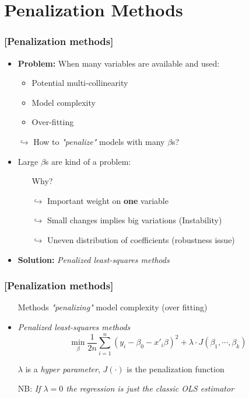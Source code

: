 \documentclass[xcolor=x11names,compress]{beamer}
\renewcommand{\(}{\begin{columns}}
\renewcommand{\)}{\end{columns}}
\newcommand{\<}[1]{\begin{column}{#1}}
\renewcommand{\>}{\end{column}}
\begin{document}
\section{Penalization Methods}


\begin{frame} %
\frametitle{\textcolor{brique}{[Penalization methods]}}
\pause
\begin{itemize}[<+->]
\item \textbf{Problem:} When many variables are available and used:
 \begin{itemize}[<+->]
        \item Potential multi-collinearity
        \item Model complexity
        \item Over-fitting
    \end{itemize}
\item[$\hookrightarrow$]  How to \emph{"penalize"} models with many $\beta$s?
\item Large $\beta$s are kind of a problem:
    \begin{itemize}[<+->]
            \item[]\begin{center} \large{ Why?} \end{center}
            \item[$\hookrightarrow$] Important weight on \textbf{one} variable
            \item[$\hookrightarrow$] Small changes implies big variations (Instability)
            \item[$\hookrightarrow$] Uneven distribution of coefficients (robustness issue)
        \end{itemize}
\item \textbf{Solution:}  \textit{ Penalized least-squares methods}
\end{itemize}
\end{frame}


\begin{frame} %
\frametitle{\textcolor{brique}{[Penalization methods]}}
\pause
\begin{itemize}[<+->]
\item[]  Methods  \emph{"penalizing"} model complexity (over fitting)
\item \textit{ Penalized least-squares methods}$$
\min_{\beta} \frac{1}{2n}
     \sum_{i=1}^{n}{ \left( y_i - \beta_0 - x'_i\beta\right)^{2} } +
\lambda \cdot J(\beta_1, \cdots, \beta_k)
$$
\item[] $\lambda$ is a \textit{hyper parameter}, $J(\cdot)$ is the penalization function
\item[NB:] \textit{If $\lambda = 0$ the regression is just the classic OLS estimator}
\end{itemize}
\end{frame}
\end{document}
